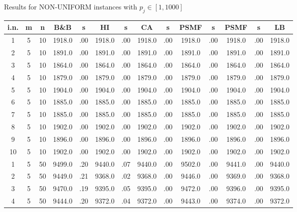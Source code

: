 \documentclass[12pt,a4paper]{article}
\begin{document}
\begin{center}
{\footnotesize  Results for NON-UNIFORM instances with $p_j \in
[1,1000]$} {\tiny
\begin{tabular}{|ccc|cc|cc|cc|cc|cc|c|}\hline
{\bf i.n.}&{\bf m}&{\bf n}&{\bf B\&B}&{\bf s}&{\bf HI}&{\bf s}&{\bf
CA}&{\bf s}&{\bf PSMF}&{\bf s}&{\bf PSMF}&{\bf s}&{\bf LB}
\\\hline
1             &   5&  10&   1918.0&  .00&   1918.0&  .00&   1918.0&  .00&   1918.0&  .00&   1918.0&  .00&   1918.0\\[-0.01in]
2             &   5&  10&   1891.0&  .00&   1891.0&  .00&   1891.0&  .00&   1891.0&  .00&   1891.0&  .00&   1891.0\\[-0.01in]
3             &   5&  10&   1864.0&  .00&   1864.0&  .00&   1864.0&  .00&   1864.0&  .00&   1864.0&  .00&   1864.0\\[-0.01in]
4             &   5&  10&   1879.0&  .00&   1879.0&  .00&   1879.0&  .00&   1879.0&  .00&   1879.0&  .00&   1879.0\\[-0.01in]
5             &   5&  10&   1904.0&  .00&   1904.0&  .00&   1904.0&  .00&   1904.0&  .00&   1904.0&  .00&   1904.0\\[-0.01in]
6             &   5&  10&   1885.0&  .00&   1885.0&  .00&   1885.0&  .00&   1885.0&  .00&   1885.0&  .00&   1885.0\\[-0.01in]
7             &   5&  10&   1885.0&  .00&   1885.0&  .00&   1885.0&  .00&   1885.0&  .00&   1885.0&  .00&   1885.0\\[-0.01in]
8             &   5&  10&   1902.0&  .00&   1902.0&  .00&   1902.0&  .00&   1902.0&  .00&   1902.0&  .00&   1902.0\\[-0.01in]
9             &   5&  10&   1896.0&  .00&   1896.0&  .00&   1896.0&  .00&   1896.0&  .00&   1896.0&  .00&   1896.0\\[-0.01in]
10            &   5&  10&   1902.0&  .00&   1902.0&  .00&   1902.0&  .00&   1902.0&  .00&   1902.0&  .00&   1902.0\\[-0.01in]
1             &   5&  50&   9499.0&  .20&   9440.0&  .07&   9440.0&  .00&   9502.0&  .00&   9441.0&  .00&   9440.0\\[-0.01in]
2             &   5&  50&   9449.0&  .21&   9368.0&  .02&   9368.0&  .00&   9446.0&  .00&   9369.0&  .00&   9368.0\\[-0.01in]
3             &   5&  50&   9470.0&  .19&   9395.0&  .05&   9395.0&  .00&   9472.0&  .00&   9396.0&  .00&   9395.0\\[-0.01in]
4             &   5&  50&   9444.0&  .20&   9372.0&  .04&   9372.0&  .00&   9443.0&  .00&   9374.0&  .00&   9372.0\\[-0.01in]

\end{tabular}}
\end{center}
\end{document}
